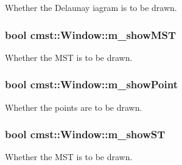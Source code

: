 Whether the Delaunay iagram is to be drawn. 

\subsubsection[{\texorpdfstring{m\+\_\+show\+M\+ST}{m_showMST}}]{\setlength{\rightskip}{0pt plus 5cm}bool cmst\+::\+Window\+::m\+\_\+show\+M\+ST\hspace{0.3cm}{\ttfamily [private]}}\hypertarget{classcmst_1_1_window_a55136499feb82b469393b5f18bb1fe88}{}\label{classcmst_1_1_window_a55136499feb82b469393b5f18bb1fe88}


Whether the M\+ST is to be drawn. 

\subsubsection[{\texorpdfstring{m\+\_\+show\+Point}{m_showPoint}}]{\setlength{\rightskip}{0pt plus 5cm}bool cmst\+::\+Window\+::m\+\_\+show\+Point\hspace{0.3cm}{\ttfamily [private]}}\hypertarget{classcmst_1_1_window_a10240817a263c467d61dad604c820f52}{}\label{classcmst_1_1_window_a10240817a263c467d61dad604c820f52}


Whether the points are to be drawn. 

\subsubsection[{\texorpdfstring{m\+\_\+show\+ST}{m_showST}}]{\setlength{\rightskip}{0pt plus 5cm}bool cmst\+::\+Window\+::m\+\_\+show\+ST\hspace{0.3cm}{\ttfamily [private]}}\hypertarget{classcmst_1_1_window_a8d8b71a285b5730cac0ce3fe63c91baf}{}\label{classcmst_1_1_window_a8d8b71a285b5730cac0ce3fe63c91baf}


Whether the M\+ST is to be drawn. 

